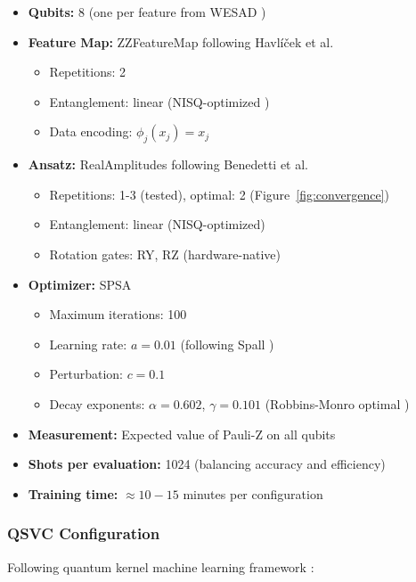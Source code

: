 \documentclass[11pt,letterpaper]{article}
\begin{document}
\begin{itemize}
\item \textbf{Qubits:} 8 (one per feature from WESAD \cite{schmidt2018introducing})
\item \textbf{Feature Map:} ZZFeatureMap following Havlíček et al. \cite{havlicek2019supervised}
\begin{itemize}
\item Repetitions: 2
\item Entanglement: linear (NISQ-optimized \cite{preskill2018quantum})
\item Data encoding: $\phi_j(x_j) = x_j$
\end{itemize}
\item \textbf{Ansatz:} RealAmplitudes following Benedetti et al. \cite{benedetti2019parameterized}
\begin{itemize}
\item Repetitions: 1-3 (tested), optimal: 2 (Figure~\ref{fig:convergence})
\item Entanglement: linear (NISQ-optimized)
\item Rotation gates: RY, RZ (hardware-native)
\end{itemize}
\item \textbf{Optimizer:} SPSA \cite{spall1992multivariate}
\begin{itemize}
\item Maximum iterations: 100
\item Learning rate: $a=0.01$ (following Spall \cite{spall1992multivariate})
\item Perturbation: $c=0.1$
\item Decay exponents: $\alpha=0.602$, $\gamma=0.101$ (Robbins-Monro optimal \cite{robbins1951stochastic})
\end{itemize}
\item \textbf{Measurement:} Expected value of Pauli-Z on all qubits
\item \textbf{Shots per evaluation:} 1024 (balancing accuracy and efficiency)
\item \textbf{Training time:} $\approx 10-15$ minutes per configuration
\end{itemize}

\subsubsection{QSVC Configuration}

Following quantum kernel machine learning framework \cite{havlicek2019supervised,schuld2021machine}:
\end{document}
